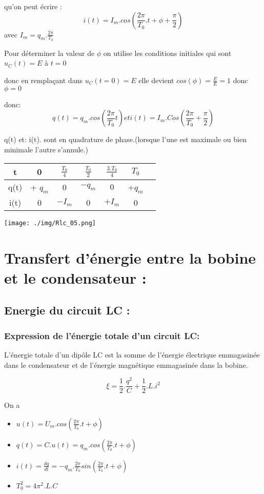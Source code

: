\documentclass[12pt]{article}
\begin{document}
qu'on peut écrire : $$i(t) = I_m.cos(\frac{2\pi}{T_0}.t + \phi + \frac{\pi}{2} )$$ avec $I_m = q_m. \frac{2\pi}{T_0}$ 

Pour déterminer la valeur de $\phi $ on utilise les conditions initiales qui sont $u_C(t) = E$ à $t = 0$

donc en remplaçant dans $u_C(t = 0) = E$ elle devient $cos(\phi) = \frac{E}{E} =1$ donc $\phi = 0$

donc: $$q(t) = q_m.cos(\frac{2\pi}{T_0}t) et i(t) = I_m.Cos(\frac{2\pi}{T_0} + \frac{\pi}{2})$$ 

q(t) et: i(t). sont en quadrature de phase.(lorsque l'une est maximale ou bien minimale l'autre s'annule.)

\begin{center}
\begin{tabular}{ |c| c| c|c|c|c|c| }
	\hline
	t   & 0 & $\frac{T_0}{4}$ & $\frac{T_0}{2}$ &$\frac{3.T_0}{4}$&$T_0$ \\\hline 
	q(t)&+ $q_m$& 0               &$-q_m$           &$0$ & +$q_m$ \\\hline 
	i(t)&0      & $-I_m$    &0           &$+I_m$ & 0 \\\hline 
\end{tabular}
\end{center}


\begin{center}
	\texttt{[image: ./img/Rlc\_05.png]}
\end{center}

\section{Transfert d'énergie entre la bobine et le condensateur : }

\subsection{Energie du circuit LC : }
\subsubsection{Expression de l'énergie totale d’un circuit LC: }
L'énergie totale d'un dipôle LC est la somme de l'énergie électrique emmagasinée dans le condensateur et de
l'énergie magnétique emmagasinée dans la bobine.

$$\xi = \frac{1}{2}.\frac{q^2}{C} + \frac{1}{2}.L.i^2$$

On a
\begin{itemize}
	\item $u(t) = U_m.cos(\frac{2\pi}{T_0}.t + \phi)$
	\item $q(t) = C.u(t) = q_m.cos(\frac{2\pi}{T_0}.t + \phi)$
	\item $i(t) = \frac{dq}{dt} = -q_m.\frac{2\pi}{T_0}sin(\frac{2\pi}{T_0}.t + \phi)$
	\item $T_0^2 = 4\pi^2 .L.C$

\end{itemize}
\end{document}
